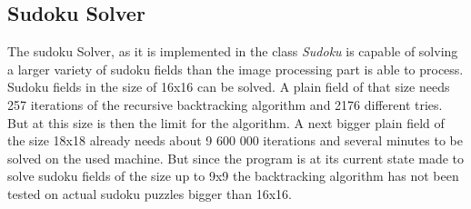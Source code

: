 \documentclass[
a4paper,     %
12pt         %
]{scrartcl}  %
\begin{document}
\subsection{Sudoku Solver}
The sudoku Solver, as it is implemented in the class \emph{Sudoku} is capable of solving a larger variety of 
sudoku fields than the image processing part is able to process. Sudoku fields in the size of 16x16 can be solved.
A plain field of that size needs 257 iterations of the recursive backtracking algorithm and 2176 different tries.
But at this size is then the limit for the algorithm. A next bigger plain field of the size 18x18 already needs about
9 600 000 iterations and several minutes to be solved on the used machine. But since the program is at its current state made to solve 
sudoku fields of the size up to 9x9 the backtracking algorithm has not been tested on actual sudoku puzzles bigger than 16x16.
\end{document}
